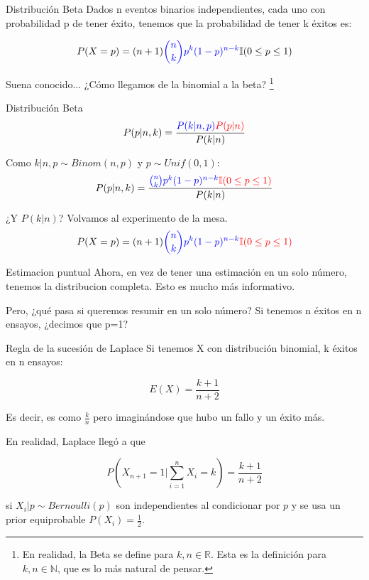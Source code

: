 \documentclass{beamer}
\begin{document}
\begin{frame}{Distribución Beta}
	Dados n eventos binarios independientes, cada uno con probabilidad p de tener éxito, tenemos que la probabilidad de tener k éxitos es:
	
	$$P(X=p) =
		(n+1)
		\textcolor{blue}{\binom{n}{k} p^k (1-p)^{n-k}}
		\mathbb{I}(0 \leq p \leq 1)$$

	Suena conocido... ¿Cómo llegamos de la binomial a la beta?
	\footnote{En realidad, la Beta se define para $k,n \in \mathbb{R}$. Esta es la definición para $k,n \in \mathbb{N}$, que es lo más natural de pensar.}
\end{frame}

\begin{frame}{Distribución Beta}
	$$P(p|n,k) = \frac{
		\textcolor{blue}{P(k|n,p)}
		\textcolor{red}{P(p|n)}
	}{
		P(k|n)
	}$$
	\pause

	Como $k|n,p \sim Binom(n, p)$ y $p \sim Unif(0, 1)$:
	$$P(p|n,k) = \frac{
		\textcolor{blue}{\binom{n}{k} p^k (1-p)^{n-k}}
		\textcolor{red}{\mathbb{I}(0 \leq p \leq 1)}
	}{
		P(k|n)
	}$$
	\pause

	¿Y $P(k|n)$? Volvamos al experimento de la mesa.
	\pause
	$$
		P(X=p) =
		(n+1)
		\textcolor{blue}{\binom{n}{k} p^k (1-p)^{n-k}}
		\textcolor{red}{\mathbb{I}(0 \leq p \leq 1)}
	$$
\end{frame}

\begin{frame}{Estimacion puntual}
  Ahora, en vez de tener una estimación en un solo número, tenemos la distribucion completa.
  Esto es mucho más informativo.\pause

  Pero, ¿qué pasa si queremos resumir en un solo número?
  Si tenemos n éxitos en n ensayos, ¿decimos que p=1?
\end{frame}

\begin{frame}{Regla de la sucesión de Laplace}
  Si tenemos X con distribución binomial, k éxitos en n ensayos:

  $$E(X) = \frac{k+1}{n+2}$$

  Es decir, es como $\frac{k}{n}$ pero imaginándose que hubo un fallo y un éxito más.\pause

  En realidad, Laplace llegó a que

  $$P(X_{n+1} = 1 | \sum_{i=1}^{n} X_i = k) = \frac{k+1}{n+2}$$

  si $X_i | p \sim Bernoulli(p)$ son independientes al condicionar por $p$ y se usa un prior equiprobable $P(X_i) = \frac{1}{2}$.
\end{frame}
\end{document}
